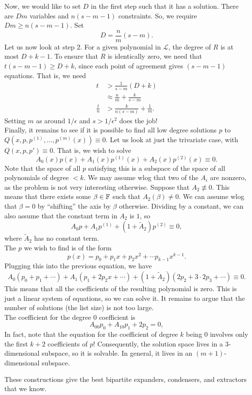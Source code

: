 		Now, we would like to set $D$ in the first step such that it has a solution. There are $Dm$ variables and $n(s-m-1)$ constraints. %
		So, we require $Dm \ge n(s-m-1)$. Set
		\[ D = \frac{n}{m}(s-m). \]
		Let us now look at step $2$. For a given polynomial in $\mathcal{L}$, the degree of $R$ is at most $D+k-1$. To ensure that $R$ is identically zero, we need that $t(s-m-1) \ge D+k$, since each point of agreement gives $(s-m-1)$ equations. That is, we need
		\begin{align*}
			t &> \frac{1}{s-m} (D+k) \\
				&\approx \frac{n}{m} + \frac{k}{s-m} \\
			\frac{t}{n} &> \frac{k}{n(s-m)} + \frac{1}{m}.
		\end{align*}
		Setting $m$ as around $1/\epsilon$ and $s > 1/\epsilon^2$ does the job!\\

		Finally, it remains to see if it is possible to find all low degree solutions $p$ to $Q(x,p,p^{(1)},\ldots,p^{(m)}(x)) \equiv 0$. Let us look at just the trivariate case, with $Q(x,p,p') \equiv 0$. That is, we wish to solve
		\[ A_0(x) p(x) + A_1(x) p^{(1)}(x) + A_2(x) p^{(2)}(x) \equiv 0. \]
		Note that the space of all $p$ satisfying this is a subspace of the space of all polynomials of degree $<k$. We may assume wlog that two of the $A_i$ are nonzero, as the problem is not very interesting otherwise. Suppose that $A_2 \not\equiv 0$. This means that there exists some $\beta \in \mathbb{F}$ such that $A_2(\beta) \ne 0$. We can assume wlog that $\beta = 0$ by ``shifting'' the axis by $\beta$ otherwise. Dividing by a constant, we can also assume that the constant term in $A_2$ is $1$, so
		\[ A_0p + A_1p^{(1)} + (1 + \tilde{A}_2)p^{(2)} \equiv 0, \]
		where $\tilde{A}_2$ has no constant term.\\
		The $p$ we wish to find is of the form
		\[ p(x) = p_0 + p_1x + p_2x^2 + \cdots p_{k-1}x^{k-1}. \]
		Plugging this into the previous equation, we have
		\[ A_0(p_0 + p_1 + \cdots) + A_1(p_1 + 2p_2x + \cdots) + (1+\tilde{A}_2)(2p_2 + 3\cdot 2p_3 + \cdots) \equiv 0. \]
		This means that all the coefficients of the resulting polynomial is zero. This is just a linear system of equations, so we can solve it. It remains to argue that the number of solutions (the list size) is not too large.\\
		The coefficient for the degree $0$ coefficient is
		\[ A_{00} p_0 + A_{10} p_1 + 2p_2 = 0, \]
		In fact, note that the equation for the coefficient of degree $k$ being $0$ involves only the first $k+2$ coefficients of $p$! Consequently, the solution space lives in a $3$-dimensional subspace, so it is solvable. In general, it lives in an $(m+1)$-dimensional subspace.


		These constructions give the best bipartite expanders, condensers, and extractors that we know. %

		\clearpage